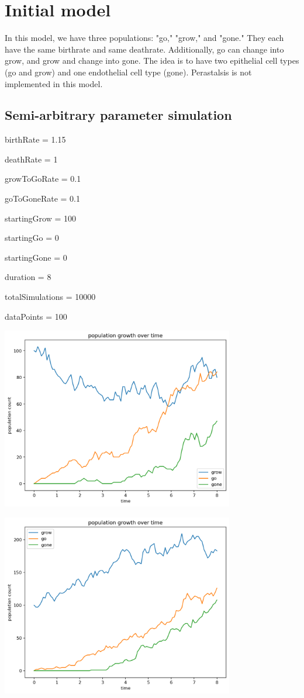 \documentclass{article}
\begin{document}
\section{Initial model}

In this model, we have three populations: "go," "grow," and "gone." They each
have the same birthrate and same deathrate. Additionally, go can change into
grow, and grow and change into gone. The idea is to have two epithelial cell
types (go and grow) and one endothelial cell type (gone). Perastalsis is not
implemented in this model.

\subsection{Semi-arbitrary parameter simulation}

birthRate = 1.15

deathRate = 1

growToGoRate = 0.1

goToGoneRate = 0.1

startingGrow = 100

startingGo = 0

startingGone = 0

duration = 8

totalSimulations = 10000

dataPoints = 100

\includegraphics[width = 4in]{sim1.png}

\includegraphics[width = 4in]{sim2.png}
\end{document}
